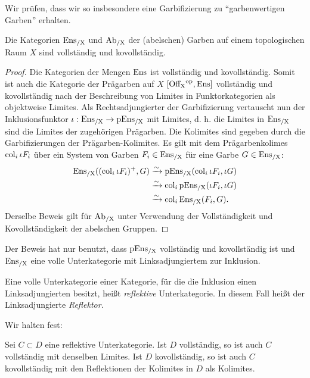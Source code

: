 Wir prüfen, dass wir so insbesondere eine Garbifizierung zu
``garbenwertigen Garben'' erhalten.
\begin{lemma} \label{ensx-complete}
  Die Kategorien $\operatorname{Ens_{/X}}$ und $\operatorname{Ab_{/X}}$ der (abelschen) Garben auf einem
  topologischen Raum $X$ sind vollständig und kovollständig.
\end{lemma}
\begin{proof}
  Die Kategorien der Mengen $\operatorname{Ens}$ ist vollständig und
  kovollständig. Somit ist auch die Kategorie der Prägarben auf $X$
  $[\operatorname{Off_X}^\mathrm{op}, \operatorname{Ens}]$ vollständig und kovollständig nach der
  Beschreibung von Limites in Funktorkategorien als objektweise
  Limites. Als Rechtsadjungierter der Garbifizierung vertauscht nun
  der Inklusionsfunktor $\iota: \operatorname{Ens_{/X}} \to \operatorname{pEns_{/X}}$ mit Limites,
  d. h. die Limites in $\operatorname{Ens_{/X}}$ sind die Limites der zugehörigen
  Prägarben. Die Kolimites sind gegeben durch die Garbifizierungen der
  Prägarben-Kolimites. Es gilt mit dem Prägarbenkolimes $\operatorname{col}_i \iota
  F_i$ über ein System von Garben $F_i \in \operatorname{Ens_{/X}}$ für eine Garbe $G
  \in \operatorname{Ens_{/X}}$:
  \begin{align*}
    \operatorname{Ens_{/X}}((\operatorname{col}_i \iota F_i)^+, G)
    &\xrightarrow[]{\sim} \operatorname{pEns_{/X}}(\operatorname{col}_i \iota F_i, \iota G) \\
    &\xrightarrow[]{\sim} \operatorname{col}_i \operatorname{pEns_{/X}}(\iota F_i, \iota G) \\
    &\xrightarrow[]{\sim} \operatorname{col}_i \operatorname{Ens_{/X}}(F_i, G).
  \end{align*}
  Derselbe Beweis gilt für $\operatorname{Ab_{/X}}$ unter Verwendung der Vollständigkeit
  und Kovollständigkeit der abelschen Gruppen.
\end{proof}
Der Beweis hat nur benutzt, dass $\operatorname{pEns_{/X}}$ vollständig und
kovollständig ist und $\operatorname{Ens_{/X}}$ eine volle Unterkategorie mit
Linksadjungiertem zur Inklusion.
\begin{defn} \label{def:refl-sub}
  Eine volle Unterkategorie einer Kategorie, für die die Inklusion
  einen Linksadjungierten besitzt, heißt \emph{reflektive}
  Unterkategorie. In diesem Fall heißt der Linksadjungierte
  \emph{Reflektor}.
\end{defn}
Wir halten fest:
\begin{prop} \label{refl-sub-complete}
  Sei $C \subset D$ eine reflektive Unterkategorie. Ist $D$
  vollständig, so ist auch $C$ vollständig mit denselben Limites. Ist
  $D$ kovollständig, so ist auch $C$ kovollständig mit den
  Reflektionen der Kolimites in $D$ als Kolimites.
\end{prop}

